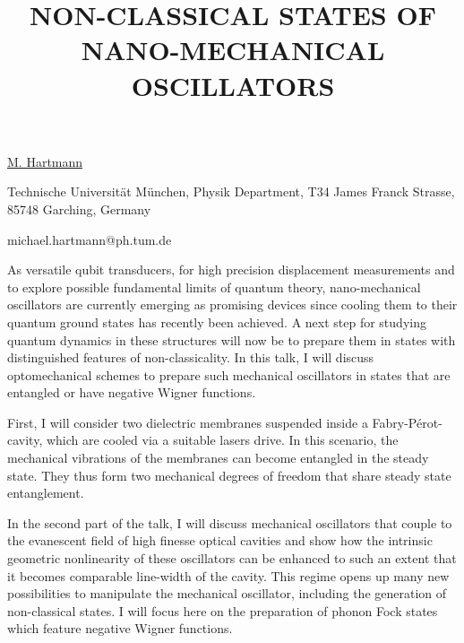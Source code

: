 \title{NON-CLASSICAL STATES OF NANO-MECHANICAL OSCILLATORS}

\underline{M. Hartmann} 

{\normalsize{\vspace{-4mm}
Technische Universit\"{a}t M\"{u}nchen, Physik Department, T34 James Franck Strasse, 85748 Garching, Germany

\email michael.hartmann@ph.tum.de}}

As versatile qubit transducers, for high precision displacement measurements and to explore possible fundamental
limits of quantum theory, nano-mechanical oscillators are currently emerging as promising devices since cooling
them to their quantum ground states has recently been achieved. A next step for studying quantum dynamics in
these structures will now be to prepare them in states with distinguished features of non-classicality. In this talk, I
will discuss optomechanical schemes to prepare such mechanical oscillators in states that are entangled or have
negative Wigner functions.

First, I will consider two dielectric membranes suspended inside a Fabry-P\'{e}rot-cavity, which are cooled via a suitable
lasers drive. In this scenario, the mechanical vibrations of the membranes can become entangled in the steady state.
They thus form two mechanical degrees of freedom that share steady state entanglement.

In the second part of the talk, I will discuss mechanical oscillators that couple to the evanescent field of high finesse
optical cavities and show how the intrinsic geometric nonlinearity of these oscillators can be enhanced to such an
extent that it becomes comparable line-width of the cavity. This regime opens up many new possibilities to
manipulate the mechanical oscillator, including the generation of non-classical states. I will focus here on the
preparation of phonon Fock states which feature negative Wigner functions.

\vspace{\baselineskip} 